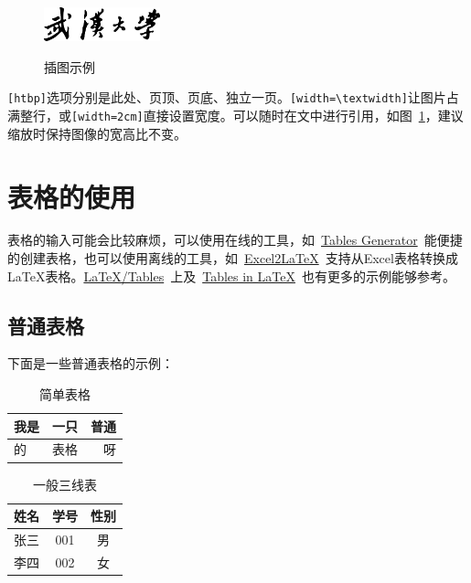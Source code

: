 \begin{figure}[!htb]
  \centering
  \includegraphics[width=0.3\textwidth]
  {figures/whulogo.pdf}\\
  \caption{插图示例}
  \label{fig:whu}
\end{figure}

\verb|[htbp]|选项分别是此处、页顶、页底、独立一页。\verb|[width=\textwidth]|让图片占满整行，或\verb|[width=2cm]|直接设置宽度。可以随时在文中进行引用，如图~\ref{fig:whu}，建议缩放时保持图像的宽高比不变。

\section{表格的使用}

表格的输入可能会比较麻烦，可以使用在线的工具，如~\href{https://www.tablesgenerator.com/}{Tables Generator}~能便捷的创建表格，也可以使用离线的工具，如~\href{https://ctan.org/pkg/excel2latex}{Excel2LaTeX}~支持从Excel表格转换成\LaTeX{}表格。\href{https://en.wikibooks.org/wiki/LaTeX/Tables}{LaTeX/Tables}~上及~\href{https://www.tug.org/pracjourn/2007-1/mori/mori.pdf}{Tables in LaTeX}~也有更多的示例能够参考。

\subsection{普通表格}
下面是一些普通表格的示例：

\begin{table}[ht]
  \centering
  \caption{简单表格}
  \label{tab:1}
  \begin{tabular}{|l|c|r|}
    \hline
    我是& 一只 & 普通\\
    \hline
    的& 表格& 呀\\
    \hline
  \end{tabular}
\end{table}

\begin{table}[ht]
  \centering
  \caption{一般三线表}
  \label{tab:2}
  \begin{tabular}{ccc}
    \hline
    姓名& 学号& 性别\\
    \hline
    张三& 001& 男\\
    李四& 002& 女\\
    \hline
  \end{tabular}
\end{table}

